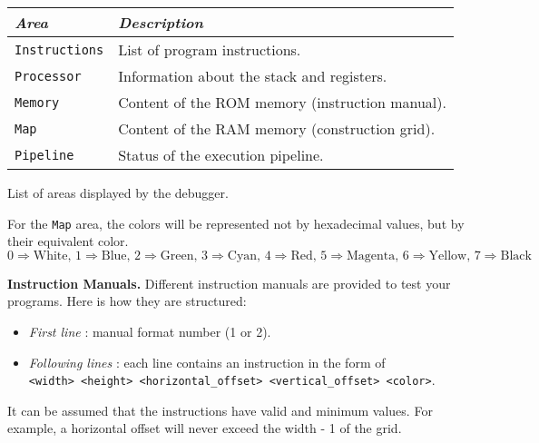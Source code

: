 \begin{center}
\begin{tabular}{ll}
  \toprule
  \emph{Area} & \emph{Description} \\
  \midrule
  \texttt{Instructions} & List of program instructions. \\
  \texttt{Processor} & Information about the stack and registers. \\
  \texttt{Memory} & Content of the ROM memory (instruction manual). \\
  \texttt{Map} & Content of the RAM memory (construction grid). \\
  \texttt{Pipeline} & Status of the execution pipeline. \\
  \bottomrule
\end{tabular}
\medskip

List of areas displayed by the debugger.
\end{center}
\medskip

\noindent
For the \texttt{Map} area, the colors will be represented not by 
hexadecimal values, but by their equivalent color.
\[
  0 \Rightarrow \text{White, } 1 \Rightarrow \text{Blue, }
  2 \Rightarrow \text{Green, } 3 \Rightarrow \text{Cyan, }
  4 \Rightarrow \text{Red, } 5 \Rightarrow \text{Magenta, }
  6 \Rightarrow \text{Yellow, } 7 \Rightarrow \text{Black}
\]
\medskip

\noindent
\textbf{Instruction Manuals. } \quad
Different instruction manuals are provided to test your 
programs. Here is how they are structured:
\begin{itemize}
  \item \emph{First line} : manual format number (1 or 2).
  \item \emph{Following lines} : each line contains an instruction in 
    the form of \\ \texttt{<width> <height> <horizontal\_offset> 
    <vertical\_offset> <color>}.
\end{itemize}
It can be assumed that the instructions have valid and minimum values. 
For example, a horizontal offset will never exceed the width - 1 of 
the grid.

